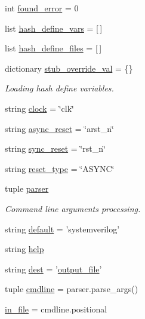 \begin{DoxyCompactItemize}
\item 
int \hyperlink{namespaceveripy_ad9424faeeafd0573d461ca2eb5305c91}{found\-\_\-error} = 0
\item 
list \hyperlink{namespaceveripy_ad9b4c40dc5027b1736989cbf60b1d8b7}{hash\-\_\-define\-\_\-vars} = \mbox{[}$\,$\mbox{]}
\item 
list \hyperlink{namespaceveripy_ad46b6d39594cb67313a7af41ad69d489}{hash\-\_\-define\-\_\-files} = \mbox{[}$\,$\mbox{]}
\item 
dictionary \hyperlink{namespaceveripy_aa9f520efe95ce8cdbd3fbe0ce8ef3aca}{stub\-\_\-override\-\_\-val} = \{\}
\begin{DoxyCompactList}\small\item\em Loading hash define variables. \end{DoxyCompactList}\item 
string \hyperlink{namespaceveripy_ae6605e6272b7db04b7d3ea58595fdd10}{clock} = \char`\"{}clk\char`\"{}
\item 
string \hyperlink{namespaceveripy_a65e6d335aa5902f4a18967da2aca2e20}{async\-\_\-reset} = \char`\"{}arst\-\_\-n\char`\"{}
\item 
string \hyperlink{namespaceveripy_a010f1413a986d15ce37b5d2cb4170578}{sync\-\_\-reset} = \char`\"{}rst\-\_\-n\char`\"{}
\item 
string \hyperlink{namespaceveripy_abd4a1cb335c94ddd87dca9c75dacce37}{reset\-\_\-type} = \char`\"{}A\-S\-Y\-N\-C\char`\"{}
\item 
tuple \hyperlink{namespaceveripy_a72fa9052a62ff431aca57cfc30c24cf5}{parser}
\begin{DoxyCompactList}\small\item\em Command line arguments processing. \end{DoxyCompactList}\item 
string \hyperlink{namespaceveripy_af8a33045ea5c3ce576ddaf55a5ff3c8f}{default} = 'systemverilog'
\item 
string \hyperlink{namespaceveripy_a31b5807026890520c5308ce732ed4b9e}{help}
\item 
string \hyperlink{namespaceveripy_ab5498e8a8340e80959241b4ca4ba5dc5}{dest} = '\hyperlink{namespaceveripy_acf3a579572b494d5b9d6ec35c9df7688}{output\-\_\-file}'
\item 
tuple \hyperlink{namespaceveripy_ad6c4cf7e3033a574cb4412b464af3966}{cmdline} = parser.\-parse\-\_\-args()
\item 
\hyperlink{namespaceveripy_af4fff95eb237e9d797e670d3c1a94b61}{in\-\_\-file} = cmdline.\-positional
\item 

\end{DoxyCompactItemize}
